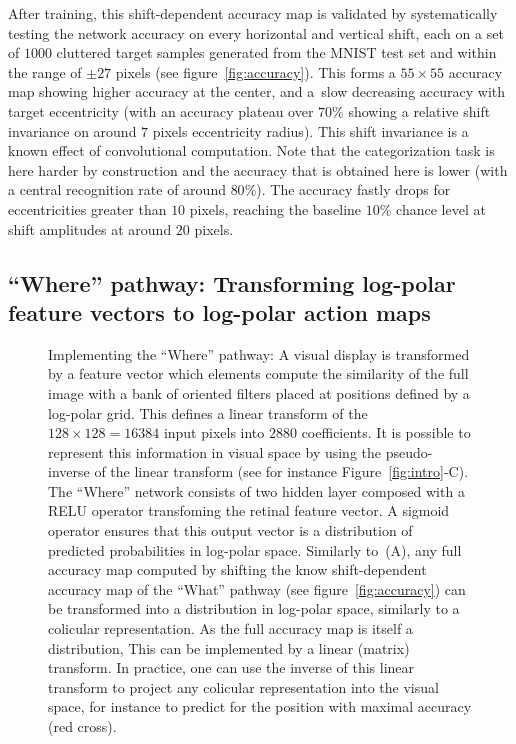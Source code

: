 After training, this shift-dependent accuracy map is validated by systematically testing the network accuracy on every horizontal and vertical shift, each on a set of $1000$ cluttered target samples generated from the MNIST test set and within the range of $\pm 27$ pixels (see figure~\ref{fig:accuracy}).  This forms a $55\times 55$ accuracy map showing higher accuracy at the center, and a slow decreasing accuracy with target eccentricity (with an accuracy plateau  over $70\%$ showing a relative shift invariance on around $7$ pixels eccentricity radius). This shift invariance is a known effect of convolutional computation. Note that the categorization task is here harder by construction and the accuracy that is obtained here is lower (with a central recognition rate of around $80\%$). The accuracy fastly drops for eccentricities  greater than $10$ pixels, reaching the baseline $10\%$ chance level at shift amplitudes at around $20$ pixels.

\subsection{``Where'' pathway: Transforming log-polar feature vectors to log-polar action maps}

\begin{figure}[t!]%
	\caption{Implementing the ``Where'' pathway: \A A visual display is transformed by a feature vector which elements compute the similarity of the full image with a bank of oriented filters placed at positions defined by a log-polar grid. This defines a linear transform of the $128\times128=16384$ input pixels into $2880$ coefficients. It is possible to represent this information in visual space by using the pseudo-inverse of the linear transform (see for instance Figure~\ref{fig:intro}-C).
	\B The ``Where'' network consists of two hidden layer composed with a RELU operator transfoming the retinal feature vector. A sigmoid operator ensures that this output vector is a distribution of predicted probabilities in log-polar space.  %
	\C Similarly to~(A), any full accuracy map computed by shifting the know shift-dependent accuracy map of the ``What'' pathway (see figure~\ref{fig:accuracy}) can be transformed into a distribution in log-polar space, similarly to a colicular representation. As the full accuracy map is itself a distribution, This can be implemented by a linear (matrix) transform. In practice, one can use the inverse of this linear transform to project any  colicular representation into the visual space, for instance to predict for the position with maximal accuracy (red cross).
	}
\label{fig:where}
\end{figure}

